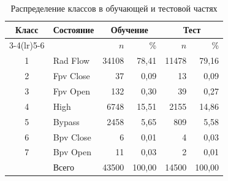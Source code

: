 \begin{table}[H]
\centering
\small
\caption{Распределение классов в обучающей и тестовой частях}\label{tab:classes}
\begin{tabular}{clrrrr}
\toprule
Класс & Состояние & \multicolumn{2}{c}{Обучение} & \multicolumn{2}{c}{Тест} \\
\cmidrule(lr){3-4}\cmidrule(lr){5-6}
 & & $n$ & \% & $n$ & \% \\
\midrule
1 & Rad Flow & 34108 & 78,41 & 11478 & 79,16 \\
2 & Fpv Close & 37 & 0,09 & 13 & 0,09 \\
3 & Fpv Open & 132 & 0,30 & 39 & 0,27 \\
4 & High & 6748 & 15,51 & 2155 & 14,86 \\
5 & Bypass & 2458 & 5,65 & 809 & 5,58 \\
6 & Bpv Close & 6 & 0,01 & 4 & 0,03 \\
7 & Bpv Open & 11 & 0,03 & 2 & 0,01 \\
\midrule
 & Всего & 43500 & 100,00 & 14500 & 100,00 \\
\bottomrule
\end{tabular}
\end{table}